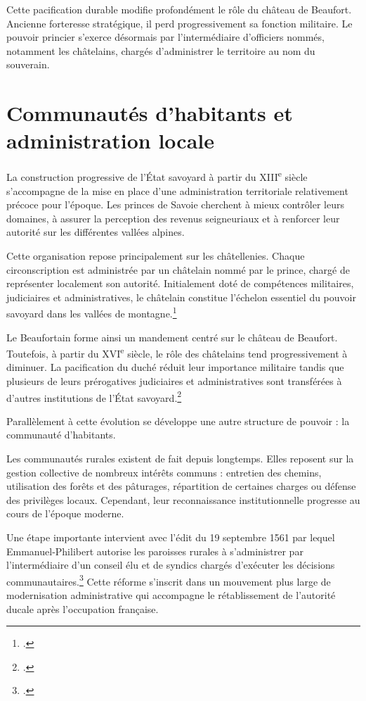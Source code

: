 \documentclass[12pt,a4paper]{report}
\begin{document}
Cette pacification durable modifie profondément le rôle du château de Beaufort. Ancienne forteresse stratégique, il perd progressivement sa fonction militaire. Le pouvoir princier s'exerce désormais par l'intermédiaire d'officiers nommés, notamment les châtelains, chargés d'administrer le territoire au nom du souverain.

\section{Communautés d'habitants et administration locale}

La construction progressive de l'État savoyard à partir du XIII\textsuperscript{e} siècle s'accompagne de la mise en place d'une administration territoriale relativement précoce pour l'époque. Les princes de Savoie cherchent à mieux contrôler leurs domaines, à assurer la perception des revenus seigneuriaux et à renforcer leur autorité sur les différentes vallées alpines.

Cette organisation repose principalement sur les châtellenies. Chaque circonscription est administrée par un châtelain nommé par le prince, chargé de représenter localement son autorité. Initialement doté de compétences militaires, judiciaires et administratives, le châtelain constitue l'échelon essentiel du pouvoir savoyard dans les vallées de montagne.\footcite[59]{Mouthon2016}

Le Beaufortain forme ainsi un mandement centré sur le château de Beaufort. Toutefois, à partir du XVI\textsuperscript{e} siècle, le rôle des châtelains tend progressivement à diminuer. La pacification du duché réduit leur importance militaire tandis que plusieurs de leurs prérogatives judiciaires et administratives sont transférées à d'autres institutions de l'État savoyard.\footcite[138]{Gachet2011GabelleSel1561}

Parallèlement à cette évolution se développe une autre structure de pouvoir : la communauté d'habitants.

Les communautés rurales existent de fait depuis longtemps. Elles reposent sur la gestion collective de nombreux intérêts communs : entretien des chemins, utilisation des forêts et des pâturages, répartition de certaines charges ou défense des privilèges locaux. Cependant, leur reconnaissance institutionnelle progresse au cours de l'époque moderne.

Une étape importante intervient avec l'édit du 19 septembre 1561 par lequel Emmanuel-Philibert autorise les paroisses rurales à s'administrer par l'intermédiaire d'un conseil élu et de syndics chargés d'exécuter les décisions communautaires.\footcite[139]{Gachet2011GabelleSel1561} Cette réforme s'inscrit dans un mouvement plus large de modernisation administrative qui accompagne le rétablissement de l'autorité ducale après l'occupation française.
\end{document}
